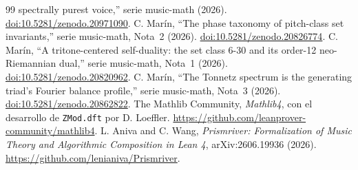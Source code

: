 \documentclass[11pt]{article}
\newcommand{\lean}[1]{\texttt{#1}}
\begin{document}
\begin{thebibliography}{99}
spectrally purest voice,'' serie music-math (2026).
\href{https://doi.org/10.5281/zenodo.20971090}{doi:10.5281/zenodo.20971090}.
 C. Mar\'in, ``The phase taxonomy of pitch-class set invariants,''
serie music-math, Nota~2 (2026).
\href{https://doi.org/10.5281/zenodo.20826774}{doi:10.5281/zenodo.20826774}.
 C. Mar\'in, ``A tritone-centered self-duality: the set class 6-30 and its
order-12 neo-Riemannian dual,'' serie music-math, Nota~1 (2026).
\href{https://doi.org/10.5281/zenodo.20820962}{doi:10.5281/zenodo.20820962}.
 C. Mar\'in, ``The Tonnetz spectrum is the generating triad's Fourier balance
profile,'' serie music-math, Nota~3 (2026).
\href{https://doi.org/10.5281/zenodo.20862822}{doi:10.5281/zenodo.20862822}.
 The Mathlib Community, \emph{Mathlib4}, con el desarrollo de \lean{ZMod.dft}
por D. Loeffler. \url{https://github.com/leanprover-community/mathlib4}.
 L. Aniva and C. Wang, \emph{Prismriver: Formalization of Music Theory
and Algorithmic Composition in Lean 4}, arXiv:2606.19936 (2026).
\url{https://github.com/lenianiva/Prismriver}.
\end{thebibliography}
\end{document}
